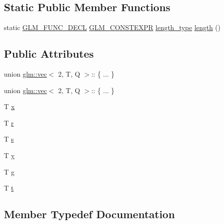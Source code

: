 \subsection*{Static Public Member Functions}
\begin{DoxyCompactItemize}
\item 
static \mbox{\hyperlink{setup_8hpp_ab2d052de21a70539923e9bcbf6e83a51}{G\+L\+M\+\_\+\+F\+U\+N\+C\+\_\+\+D\+E\+CL}} \mbox{\hyperlink{setup_8hpp_a08b807947b47031d3a511f03f89645ad}{G\+L\+M\+\_\+\+C\+O\+N\+S\+T\+E\+X\+PR}} \mbox{\hyperlink{structglm_1_1vec_3_012_00_01_t_00_01_q_01_4_af8b652526ec88c8513b2a8c05bf92441}{length\+\_\+type}} \mbox{\hyperlink{structglm_1_1vec_3_012_00_01_t_00_01_q_01_4_a93fee4eb07a69842caff0d41acf83ddd}{length}} ()
\end{DoxyCompactItemize}
\subsection*{Public Attributes}
\begin{DoxyCompactItemize}
\item 
union \mbox{\hyperlink{structglm_1_1vec}{glm\+::vec}}$<$ 2, T, Q $>$\+:: \{ ... \}  
\item 
union \mbox{\hyperlink{structglm_1_1vec}{glm\+::vec}}$<$ 2, T, Q $>$\+:: \{ ... \}  
\item 
T \mbox{\hyperlink{structglm_1_1vec_3_012_00_01_t_00_01_q_01_4_a49302c697fe0183c08329f51cdf70894}{x}}
\item 
T \mbox{\hyperlink{structglm_1_1vec_3_012_00_01_t_00_01_q_01_4_a8a13d65214d1106eb2e6c9ce472b99d3}{r}}
\item 
T \mbox{\hyperlink{structglm_1_1vec_3_012_00_01_t_00_01_q_01_4_a8d48d79792a1a615db48fb825512f5a6}{s}}
\item 
T \mbox{\hyperlink{structglm_1_1vec_3_012_00_01_t_00_01_q_01_4_ad674beb9a1e35fe0390507911daad747}{y}}
\item 
T \mbox{\hyperlink{structglm_1_1vec_3_012_00_01_t_00_01_q_01_4_aaf3f27aace8dfa7faee4c496738852b4}{g}}
\item 
T \mbox{\hyperlink{structglm_1_1vec_3_012_00_01_t_00_01_q_01_4_a5bf8dc6f825eb9798f810fd7135b5777}{t}}
\end{DoxyCompactItemize}


\subsection{Member Typedef Documentation}
\mbox{\label{structglm_1_1vec_3_012_00_01_t_00_01_q_01_4_a69145b83aafbff09d5d187089564c46f}} 
